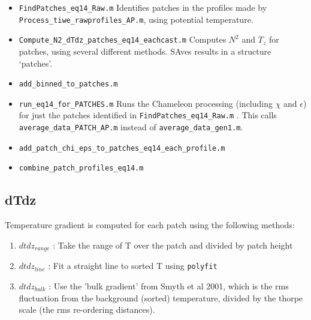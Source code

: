 \documentclass[11pt]{article}
\begin{document}
\begin{itemize}

\item \verb+FindPatches_eq14_Raw.m+ Identifies patches in the profiles made by \verb+Process_tiwe_rawprofiles_AP.m+, using potential temperature.

\item \verb+Compute_N2_dTdz_patches_eq14_eachcast.m+ Computes $N^2$ and $T_z$ for patches, using several different methods. SAves results in a structure `patches'.

\item \verb+add_binned_to_patches.m+

\item \verb+run_eq14_for_PATCHES.m+ Runs the Chameleon processing (including $\chi$ and $\epsilon$) for just the patches identified in \verb+FindPatches_eq14_Raw.m+ . This calls \verb+average_data_PATCH_AP.m+ instead of \verb+average_data_gen1.m+.

\item \verb+add_patch_chi_eps_to_patches_eq14_each_profile.m+

\item \verb+combine_patch_profiles_eq14.m+


\end{itemize}

\medskip


\subsection{dTdz}

Temperature gradient is computed for each patch using the following methods:
\begin{enumerate}
\item $dtdz_{range}$ : Take the range of T over the patch and divided by patch height
\item $dtdz_{line}$ : Fit a straight line to sorted T using \verb+polyfit+
\item $dtdz_{bulk}$ : Use the 'bulk gradient' from Smyth et al 2001, which is the rms fluctuation from the background (sorted) temperature, divided by the thorpe scale (the rms re-ordering distances).
\end{enumerate}
\end{document}

